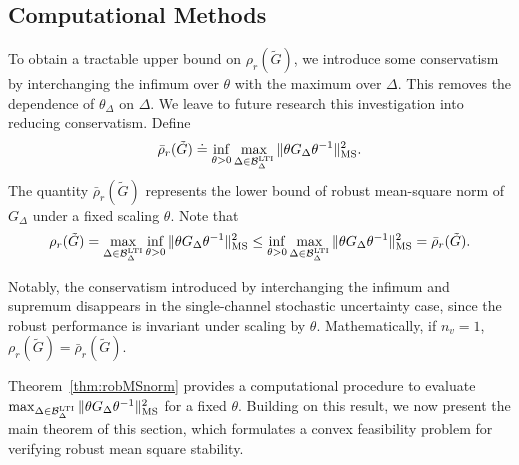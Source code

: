 

\subsection{Computational Methods}
To obtain a tractable upper bound on $\rho_r(\tilde{G})$, we introduce some conservatism by interchanging the infimum over $\theta$ with the maximum over $\Delta$. This removes the dependence of $\theta_\Delta$ on $\Delta$. We leave to future research this investigation into reducing conservatism. 
Define
$$
\bar{\rho}_r(\tilde{G}) \doteq \inf_{\theta>0}\max_{\Delta\in\mathcal{B}_\Delta^{\mathrm{LTI}}}\|\theta G_\Delta\theta^{-1}\|^2_{\rm{MS}}.
$$
The quantity $\bar{\rho}_r(\tilde{G})$ represents the lower bound of robust mean-square norm of $G_\Delta$ under a fixed scaling $\theta$.
Note that  
\begin{equation*}
\rho_r(\tilde{G})=\max_{\Delta\in\mathcal{B}_\Delta^{\mathrm{LTI}}}\inf_{\theta>0}\|\theta G_\Delta\theta^{-1}\|^2_{\rm{MS}}\leq \inf_{\theta>0}\max_{\Delta\in\mathcal{B}_\Delta^{\mathrm{LTI}}}\|\theta G_\Delta\theta^{-1}\|^2_{\rm{MS}} = \bar{\rho}_r(\tilde{G}).
\end{equation*}
\begin{rem}\label{rem:1chn}
Notably, the conservatism introduced by interchanging the infimum and supremum disappears in the single-channel stochastic uncertainty case, since the robust performance is invariant under scaling by \(\theta\).
Mathematically, if $n_v = 1$, $\rho_r(\tilde{G}) = \bar{\rho}_r(\tilde{G})$.
\end{rem}


Theorem~\ref{thm:robMSnorm} provides a computational procedure to evaluate 
$\max_{\Delta \in \mathcal{B}_\Delta^{\mathrm{LTI}}} \|\theta G_\Delta \theta^{-1}\|^2_{\rm MS}$ 
for a fixed $\theta$. Building on this result, we now present the main theorem of this section, which formulates a convex feasibility problem for verifying robust mean square stability.

